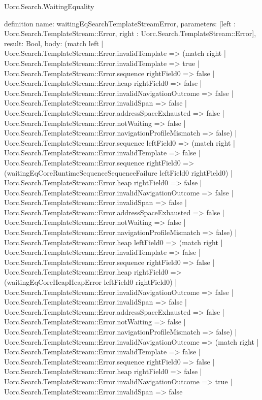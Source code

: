 \begin{lexlean}{Uorc.Search.WaitingEquality}
\begin{semanticmodule}
definition{
  name: waitingEqSearchTemplateStreamError,
  parameters: [left : Uorc.Search.TemplateStream::Error, right : Uorc.Search.TemplateStream::Error],
  result: Bool,
  body: (match left
    | Uorc.Search.TemplateStream::Error.invalidTemplate => (match right
      | Uorc.Search.TemplateStream::Error.invalidTemplate => true
      | Uorc.Search.TemplateStream::Error.sequence rightField0 => false
      | Uorc.Search.TemplateStream::Error.heap rightField0 => false
      | Uorc.Search.TemplateStream::Error.invalidNavigationOutcome => false
      | Uorc.Search.TemplateStream::Error.invalidSpan => false
      | Uorc.Search.TemplateStream::Error.addressSpaceExhausted => false
      | Uorc.Search.TemplateStream::Error.notWaiting => false
      | Uorc.Search.TemplateStream::Error.navigationProfileMismatch => false)
    | Uorc.Search.TemplateStream::Error.sequence leftField0 => (match right
      | Uorc.Search.TemplateStream::Error.invalidTemplate => false
      | Uorc.Search.TemplateStream::Error.sequence rightField0 => (waitingEqCoreRuntimeSequenceSequenceFailure leftField0 rightField0)
      | Uorc.Search.TemplateStream::Error.heap rightField0 => false
      | Uorc.Search.TemplateStream::Error.invalidNavigationOutcome => false
      | Uorc.Search.TemplateStream::Error.invalidSpan => false
      | Uorc.Search.TemplateStream::Error.addressSpaceExhausted => false
      | Uorc.Search.TemplateStream::Error.notWaiting => false
      | Uorc.Search.TemplateStream::Error.navigationProfileMismatch => false)
    | Uorc.Search.TemplateStream::Error.heap leftField0 => (match right
      | Uorc.Search.TemplateStream::Error.invalidTemplate => false
      | Uorc.Search.TemplateStream::Error.sequence rightField0 => false
      | Uorc.Search.TemplateStream::Error.heap rightField0 => (waitingEqCoreHeapHeapError leftField0 rightField0)
      | Uorc.Search.TemplateStream::Error.invalidNavigationOutcome => false
      | Uorc.Search.TemplateStream::Error.invalidSpan => false
      | Uorc.Search.TemplateStream::Error.addressSpaceExhausted => false
      | Uorc.Search.TemplateStream::Error.notWaiting => false
      | Uorc.Search.TemplateStream::Error.navigationProfileMismatch => false)
    | Uorc.Search.TemplateStream::Error.invalidNavigationOutcome => (match right
      | Uorc.Search.TemplateStream::Error.invalidTemplate => false
      | Uorc.Search.TemplateStream::Error.sequence rightField0 => false
      | Uorc.Search.TemplateStream::Error.heap rightField0 => false
      | Uorc.Search.TemplateStream::Error.invalidNavigationOutcome => true
      | Uorc.Search.TemplateStream::Error.invalidSpan => false
}
\end{semanticmodule}
\end{lexlean}
